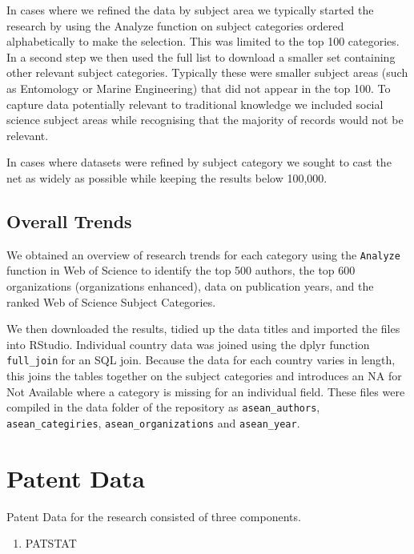 \documentclass[]{book}
\providecommand{\tightlist}{%
  \setlength{\itemsep}{0pt}\setlength{\parskip}{0pt}}
\theoremstyle{definition}
\theoremstyle{definition}
\theoremstyle{definition}
\theoremstyle{remark}
\begin{document}
In cases where we refined the data by subject area we typically started
the research by using the Analyze function on subject categories ordered
alphabetically to make the selection. This was limited to the top 100
categories. In a second step we then used the full list to download a
smaller set containing other relevant subject categories. Typically
these were smaller subject areas (such as Entomology or Marine
Engineering) that did not appear in the top 100. To capture data
potentially relevant to traditional knowledge we included social science
subject areas while recognising that the majority of records would not
be relevant.

In cases where datasets were refined by subject category we sought to
cast the net as widely as possible while keeping the results below
100,000.

\hypertarget{overall-trends}{%
\subsection{Overall Trends}\label{overall-trends}}

We obtained an overview of research trends for each category using the
\texttt{Analyze} function in Web of Science to identify the top 500
authors, the top 600 organizations (organizations enhanced), data on
publication years, and the ranked Web of Science Subject Categories.

We then downloaded the results, tidied up the data titles and imported
the files into RStudio. Individual country data was joined using the
dplyr function \texttt{full\_join} for an SQL join. Because the data for
each country varies in length, this joins the tables together on the
subject categories and introduces an NA for Not Available where a
category is missing for an individual field. These files were compiled
in the data folder of the repository as \texttt{asean\_authors},
\texttt{asean\_categiries}, \texttt{asean\_organizations} and
\texttt{asean\_year}.

\hypertarget{patent-data}{%
\section{Patent Data}\label{patent-data}}

Patent Data for the research consisted of three components.

\begin{enumerate}
\def\labelenumi{\arabic{enumi}.}
\tightlist
\item
  PATSTAT
\end{enumerate}
\end{document}
